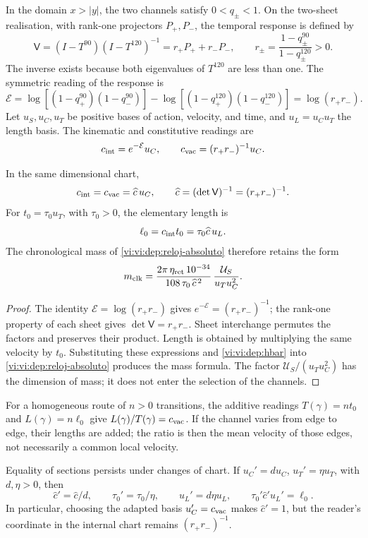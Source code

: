 In the domain \(x>|y|\), the two channels satisfy \(0<q_\pm<1\).
On the two-sheet realisation, with rank-one projectors
\(P_+,P_-\), the temporal response is defined by
\[
 \mathsf V=(I-T^{90})(I-T^{120})^{-1}
          =r_+P_++r_-P_-,
 \qquad r_\pm=\frac{1-q_\pm^{90}}{1-q_\pm^{120}}>0.
\]
The inverse exists because both eigenvalues of \(T^{120}\) are less
than one. The symmetric reading of the response is
\[
 \mathcal E=
 \log[(1-q_+^{90})(1-q_-^{90})]
 -\log[(1-q_+^{120})(1-q_-^{120})]
 =\log(r_+r_-).
\]
Let \(u_S,u_C,u_T\) be positive bases of action, velocity, and
time, and \(u_L=u_Cu_T\) the length basis. The kinematic
and constitutive readings are
\[
 c_{\rm int}=e^{-\mathcal E}u_C,\qquad
 c_{\rm vac}=(r_+r_-)^{-1}u_C.
\]

\begin{proposition}
\label{vi:vi:dep:velocidad-comun}
In the same dimensional chart,
\[
 c_{\rm int}=c_{\rm vac}=\widehat c\,u_C,
 \qquad \widehat c=(\det\mathsf V)^{-1}=(r_+r_-)^{-1}.
\]
For \(t_0=\tau_0u_T\), with \(\tau_0>0\), the elementary length is
\[
 \ell_0=c_{\rm int}t_0=\tau_0\widehat c\,u_L.
\]
The chronological mass of \eqref{vi:vi:dep:reloj-absoluto} therefore
retains the form
\[
 m_{\rm clk}=
 \frac{2\pi\,\eta_{\rm ret}\,10^{-34}}
      {108\,\tau_0\,\widehat c^{\,2}}\,
 \frac{\mathcal U_S}{u_Tu_C^2}.
\]
\end{proposition}
\begin{proof}
The identity \(\mathcal E=\log(r_+r_-)\) gives
\(e^{-\mathcal E}=(r_+r_-)^{-1}\); the rank-one property of each sheet gives
\(\det\mathsf V=r_+r_-\). Sheet interchange permutes the
factors and preserves their product. Length is obtained by multiplying
the same velocity by \(t_0\). Substituting these expressions and
\eqref{vi:vi:dep:hbar} into \eqref{vi:vi:dep:reloj-absoluto} produces the
mass formula. The factor \(\mathcal U_S/(u_Tu_C^2)\) has
the dimension of mass; it does not enter the selection of the channels.
\end{proof}

For a homogeneous route of \(n>0\) transitions, the additive readings
\(T(\gamma)=nt_0\) and \(L(\gamma)=n\ell_0\) give
\(L(\gamma)/T(\gamma)=c_{\rm vac}\). If the channel varies from
edge to edge, their lengths are added; the ratio is then the mean
velocity of those edges, not necessarily a common local velocity.

Equality of sections persists under changes of chart. If
\(u_C'=du_C\), \(u_T'=\eta u_T\), with \(d,\eta>0\), then
\[
 \widehat c'=\widehat c/d,\qquad
 \tau_0'=\tau_0/\eta,\qquad u_L'=d\eta u_L,
 \qquad
 \tau_0'\widehat c'u_L'=\ell_0.
\]
In particular, choosing the adapted basis \(u_C'=c_{\rm vac}\)
makes \(\widehat c'=1\), but the reader's coordinate in the
internal chart remains \((r_+r_-)^{-1}\).

